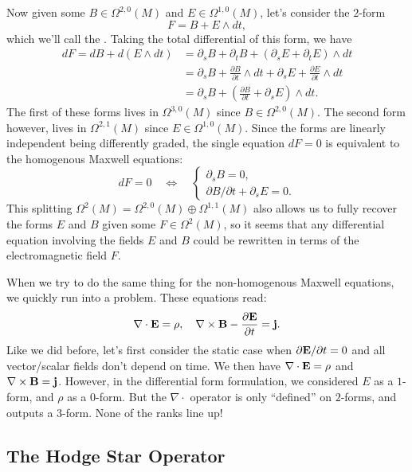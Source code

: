 \documentclass{article}
\begin{document}
Now given some $B\in \Omega^{2,0}(M)$ and $E\in \Omega^{1,0}(M)$, let's consider the $2$-form
\[
    F = B + E\wedge dt,
\]
which we'll call the . Taking the total differential of this form, we have
\[
  \begin{aligned}
    dF = dB + d(E\wedge dt) &= \partial_s B + \partial_t B + (\partial_s E + \partial_t E)\wedge dt\\
                            &= \partial_s B + \frac{\partial B}{\partial t}\wedge dt +\partial_s E + \frac{\partial E}{\partial t} \wedge dt\\
                            &= \partial_s B + \left(\frac{\partial B}{\partial t} +\partial_s E\right) \wedge dt.
  \end{aligned}
\]
The first of these forms lives in $\Omega^{3,0}(M)$ since $B\in \Omega^{2,0}(M)$. The second form however, lives in $\Omega^{2,1}(M)$ since $E\in \Omega^{1,0}(M)$. Since the forms are linearly independent being differently graded, the single equation $dF=0$ is equivalent to the homogenous Maxwell equations: 
\[
  dF = 0 \quad\iff\quad \begin{cases} \partial_s B = 0,\\ \partial B/\partial t + \partial_s E = 0.\end{cases}
\]
This splitting $\Omega^2(M) = \Omega^{2,0}(M)\oplus\Omega^{1,1}(M)$ also allows us to fully recover the forms $E$ and $B$ given some $F\in \Omega^2(M)$, so it seems that any differential equation involving the fields $E$ and $B$ could be rewritten in terms of the electromagnetic field $F$.

When we try to do the same thing for the non-homogenous Maxwell equations, we quickly run into a problem. These equations read:
\[
  \nabla\cdot \mathbf{E} = \rho, \quad \nabla\times \mathbf{B} - \frac{\partial \mathbf{E}}{\partial t} = \mathbf{j}.
\]
Like we did before, let's first consider the static case when $\partial \mathbf{E}/\partial t = 0$ and all vector/scalar fields don't depend on time. We then have $\nabla\cdot \mathbf{E}=\rho$ and $\nabla\times \mathbf{B} =\mathbf{j}$. However, in the differential form formulation, we considered $E$ as a $1$-form, and $\rho$ as a $0$-form. But the $\nabla\cdot$ operator is only ``defined'' on $2$-forms, and outputs a $3$-form. None of the ranks line up!

\subsection{The Hodge Star Operator}
\end{document}
